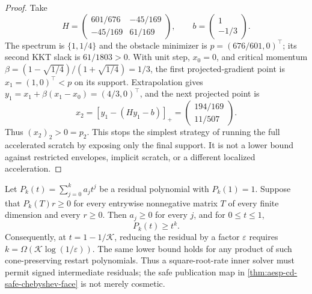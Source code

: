 \begin{proof}
Take
\begin{equation*}
 H=\begin{pmatrix}601/676&-45/169\\-45/169&61/169\end{pmatrix},
 \qquad b=\begin{pmatrix}1\\-1/3\end{pmatrix}.
\end{equation*}
The spectrum is $\{1,1/4\}$ and the obstacle minimizer is
$p=(676/601,0)^\top$; its second KKT slack is $61/1803>0$.
With unit step, $x_0=0$, and critical momentum
$\beta=(1-\sqrt{1/4})/(1+\sqrt{1/4})=1/3$, the first projected-gradient
point is $x_1=(1,0)^\top<p$ on its support.  Extrapolation gives
$y_1=x_1+\beta(x_1-x_0)=(4/3,0)^\top$, and the next projected point is
\begin{equation*}
 x_2=[y_1-(Hy_1-b)]_+
 =\begin{pmatrix}194/169\\11/507\end{pmatrix}.
\end{equation*}
Thus $(x_2)_2>0=p_2$.  This stops the simplest strategy of running the full
accelerated scratch by exposing only the final support.  It is not a lower
bound against restricted envelopes, implicit scratch, or a different
localized acceleration.
\end{proof}

\begin{proposition}
\label{prop:aesp-cd-positive-polynomial-stop}
Let $P_k(t)=\sum_{j=0}^k a_jt^j$ be a residual polynomial with
$P_k(1)=1$.  Suppose that $P_k(T)r\geq0$ for every entrywise nonnegative
matrix $T$ of every finite dimension and every $r\geq0$.  Then
$a_j\geq0$ for every $j$, and for $0\leq t\leq1$,
\begin{equation}
 P_k(t)\geq t^k.
 \label{eq:aesp-cd-positive-polynomial-stop}
\end{equation}
Consequently, at $t=1-1/\mathcal K$, reducing the residual by a factor
$\varepsilon$ requires
$k=\Omega(\mathcal K\log(1/\varepsilon))$.  The same lower bound holds for
any product of such cone-preserving restart polynomials.  Thus a
square-root-rate inner solver must permit signed intermediate residuals; the
safe publication map in
\cref{thm:aesp-cd-safe-chebyshev-face} is not merely cosmetic.
\end{proposition}

